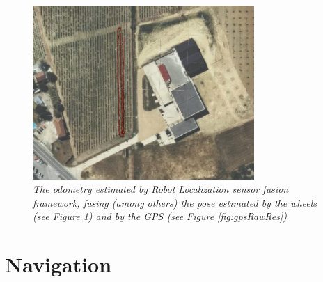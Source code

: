 \begin{figure}
	\centering
	\includegraphics[width=0.75\textwidth]{Images/experimental_data/rob_loc_result.png}
	\caption{\textit{The odometry estimated by Robot Localization sensor fusion framework, fusing (among others) the pose estimated by the wheels (see Figure \ref{fig:wheelsOdometryRes}) and by the GPS (see Figure \ref{fig:gpsRawRes})}}
	\label{fig:wheelsOdometryRes}
\end{figure}

\section{Navigation}

